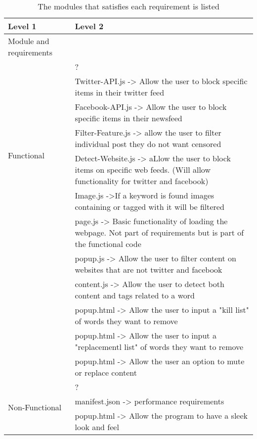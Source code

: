 \documentclass[12pt, titlepage]{article}
\begin{document}
\begin{table}[h!]
\centering
\begin{tabular}{p{} p{}}
\toprule
\textbf{Level 1} & \textbf{Level 2}\\
\midrule
{Module and requirements} & ~ \\
\midrule
\multirow{7}{0.3\textwidth}{Functional} & ?\\
& Twitter-API.js -> Allow the user to block specific items in their twitter feed\\
& Facebook-API.js -> Allow the user to block specific items in their newsfeed\\
&Filter-Feature.js -> allow the user to filter individual post they do not want censored\\
&Detect-Website.js -> aLlow the user to block items on specific web feeds. (Will allow functionality for twitter and facebook)\\
&Image.js ->If a keyword is found images containing or tagged with it will be filtered\\
& page.js -> Basic functionality of loading the webpage. Not part of requirements but is part of the functional code\\
& popup.js -> Allow the user to filter content on websites that are not twitter and facebook\\
& content.js -> Allow the user to detect both content and tags related to a word\\
& popup.html -> Allow the user to input a "kill list" of words they want to remove\\
& popup.html -> Allow the user to input a "replacementl list" of words they want to remove\\
& popup.html -> Allow the user an option to mute or replace content\\
\midrule
\multirow{3}{0.3\textwidth}{Non-Functional} & {?}\\
& manifest.json -> performance requirements\\
& popup.html -> Allow the program to have a sleek look and feel\\

\bottomrule
\end{tabular}
\caption{The modules that satisfies each requirement is listed}
\label{TblMH}
\end{table}
\end{document}
